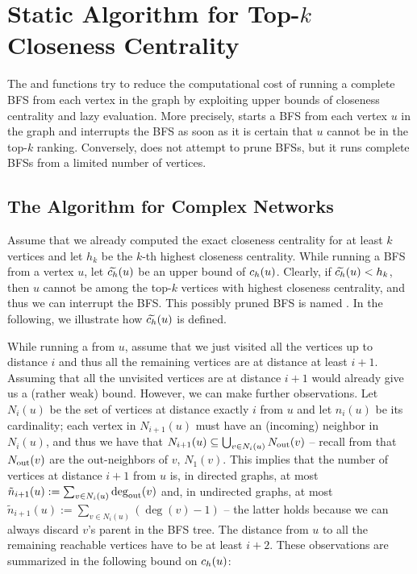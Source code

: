 \section{Static Algorithm for Top-$k$ Closeness Centrality}
\label{sec:topk-clos-static}
%
The \nbcut and \nbbound functions try to reduce the computational cost of
running a complete BFS from each vertex in the graph by exploiting upper bounds
of closeness centrality and lazy evaluation.
More precisely, \nbcut starts a BFS from each vertex $u$ in the graph and
interrupts the BFS as soon as it is certain that $u$ cannot be in the top-$k$ ranking.
Conversely, \nbbound does not attempt to prune BFSs, but it runs complete BFSs from
a limited number of vertices.

\subsection{The \nbcut Algorithm for Complex Networks}
\label{sec:nbcut}
%
Assume that we already computed the exact closeness centrality for at least $k$ vertices
and let $h_k$ be the $k$-th highest closeness centrality. While
running a BFS from a vertex $u$, let $\widetilde{c_h}(u)$ be an upper bound of
$c_h(u)$. Clearly, if $\widetilde{c_h}(u) < h_k$, then $u$ cannot be among
the top-$k$ vertices with highest closeness centrality, and thus we can
interrupt the BFS. This possibly pruned BFS is named \bfscut.
In the following, we illustrate how $\widetilde{c_h}(u)$ is defined.

While running a \bfscut from $u$, assume that we just visited all the vertices
up to distance $i$ and thus all the remaining vertices are at distance
at least $i + 1$. Assuming that all the unvisited vertices are at distance
$i + 1$ would already give us a (rather weak) bound. However, we can make further
observations. Let $N_i(u)$ be the set of vertices at distance exactly
$i$ from $u$ and let $n_i(u)$ be its cardinality; each vertex in $N_{i + 1}(u)$ must
have an (incoming) neighbor in $N_i(u)$, and thus we have that $N_{i + 1}(u)
\subseteq \bigcup_{v \in N_i(u)}
N_{\text{out}}(v)$ -- recall from  that $N_{\text{out}}(v)$ are the
out-neighbors of $v$, \ie $N_1(v)$.
This implies that the number of vertices
at distance $i + 1$ from $u$ is, in directed graphs, at most
$\tilde{n}_{i + 1}(u) := \sum_{v \in N_i(u)} \deg_{\text{out}}(v)$ and, in undirected graphs,
at most $\tilde{n}_{i + 1}(u) := \sum_{v \in N_i(u)} (\deg(v) - 1)$ -- the latter
holds because we can always discard $v$'s parent in the BFS tree.
The distance from $u$ to all the remaining reachable vertices have to be
at least $i + 2$. These observations are summarized in the following bound
on $c_h(u)$:

